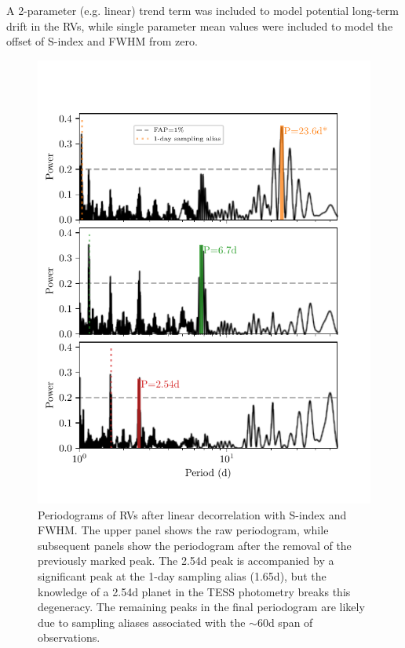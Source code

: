 \documentclass[fleqn,usenatbib]{mnras}
\newcommand{\TSindexperiod}{ $ 39.0 \pm 11.0 $ }
\begin{document}
A 2-parameter (e.g. linear) trend term was included to model potential long-term drift in the RVs, while single parameter mean values were included to model the offset of S-index and FWHM from zero.

\begin{figure}
	\includegraphics[width=\columnwidth, trim={0.3cm 1.1cm 0.8cm 1.3cm}]{TOI755_decorrelation_periodograms}
    \caption{Periodograms of RVs after linear decorrelation with S-index and FWHM. The upper panel shows the raw periodogram, while subsequent panels show the periodogram after the removal of the previously marked peak. The 2.54d peak is accompanied by a significant peak at the 1-day sampling alias (1.65d), but the knowledge of a 2.54d planet in the TESS photometry breaks this degeneracy. The remaining peaks in the final periodogram are likely due to sampling aliases associated with the $\sim60$d span of observations.}
    \label{fig:rv_decorr}
\end{figure}
\end{document}
